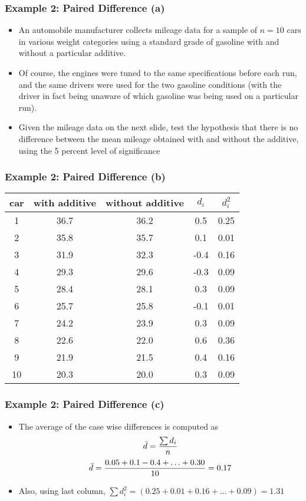 ﻿\documentclass[a4]{beamer}
\begin{document}
\begin{frame}
\frametitle{Example 2: Paired Difference (a)}
\begin{itemize}
\item An automobile manufacturer collects mileage data for a sample of $n = 10$ cars in various weight categories
using a standard grade of gasoline with and without a particular additive. \item Of course, the engines were tuned to the same
specifications before each run, and the same drivers were used for the two gasoline conditions (with the driver in fact being
unaware of which gasoline was being used on a particular run). \item Given the mileage data on the next slide,  test the hypothesis
that there is no difference between the mean mileage obtained with and without the additive, using the 5 percent level of
significance \end{itemize}
\end{frame}
\begin{frame}
\frametitle{Example 2: Paired Difference (b)}
\small
\begin{center}
\begin{tabular}{|c|c|c|c|c|}\hline
car & with additive & without additive & $d_i$ & $d^2_i$\\\hline
1&36.7&36.2&0.5&0.25\\\hline
2&35.8&35.7&0.1&0.01\\\hline
3&31.9&32.3&-0.4&0.16\\\hline
4&29.3&29.6&-0.3&0.09\\\hline
5&28.4&28.1&0.3&0.09\\\hline
6&25.7&25.8&-0.1&0.01\\\hline
7&24.2&23.9&0.3&0.09\\\hline
8&22.6&22.0&0.6&0.36\\\hline
9&21.9&21.5&0.4&0.16\\\hline
10&20.3&20.0&0.3&0.09\\\hline
\end{tabular}
\end{center}
\end{frame}

\begin{frame}
\frametitle{Example 2: Paired Difference (c)}
\begin{itemize}
\item The average of the case wise differences is computed as \[\bar{d} = {\sum d_i \over n}\]
\[ \bar{d} = { 0.05 + 0.1  - 0.4 + \ldots + 0.30 \over 10 }= 0.17 \]
\item Also, using last column, $\sum d^2_i = (0.25 + 0.01 + 0.16 + \ldots + 0.09) = 1.31$
\end{itemize}

\end{frame}
\end{document}
